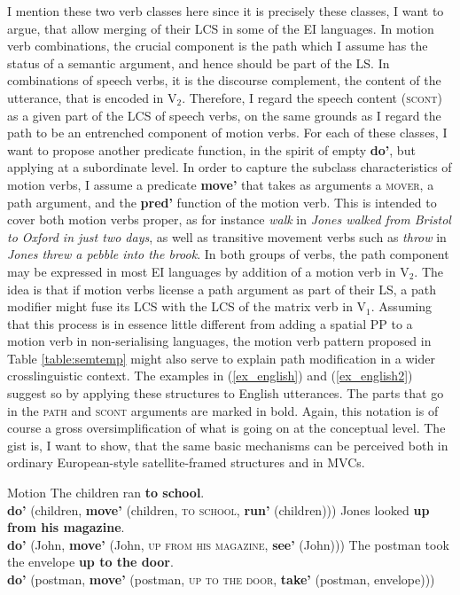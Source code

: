 I mention these two verb classes here since it is precisely these classes, I want to argue, that allow merging of their LCS in some of the EI languages. In motion verb combinations, the crucial component is the path which I assume has the status of a semantic argument, and hence should be part of the LS. In combinations of speech verbs, it is the discourse complement, the content of the utterance, that is encoded in V$_2$. Therefore, I regard the speech content (\textsc{scont}) as a given part of the LCS of speech verbs, on the same grounds as I regard the path to be an entrenched component of motion verbs. For each of these classes, I want to propose another predicate function, in the spirit of empty \textbf{do'}, but applying at a subordinate level. In order to capture the subclass characteristics of motion verbs, I assume a predicate \textbf{move'} that takes as arguments a \textsc{mover}, a path argument, and the \textbf{pred'} function of the motion verb. This is intended to cover both motion verbs proper, as for instance \textit{walk} in \textit{Jones walked from Bristol to Oxford in just two days}, as well as transitive movement verbs such as \textit{throw} in \textit{Jones threw a pebble into the brook}. In both groups of verbs, the path component may be expressed in most EI languages by addition of a motion verb in V$_2$. The idea is that if motion verbs license a path argument as part of their LS, a path modifier might fuse its LCS with the LCS of the matrix verb in V$_1$. Assuming that this process is in essence little different from adding a spatial PP to a motion verb in non-serialising languages, the motion verb pattern proposed in Table \ref{table:semtemp} might also serve to explain path modification in a wider crosslinguistic context. The examples in (\ref{ex_english}) and (\ref{ex_english2}) suggest so by applying these structures to English utterances. The parts that go in the \textsc{path} and \textsc{scont} arguments are marked in bold. Again, this notation is of course a gross oversimplification of what is going on at the conceptual level. The gist is, I want to show, that the same basic mechanisms can be perceived both in ordinary European-style satellite-framed structures and in MVCs.

\ea Motion \label{ex_english}
\ea The children ran \textbf{to school}. \\
\textbf{do'} (children, \textbf{move'} (children, \textsc{to school}, \textbf{run'} (children)))
\ex Jones looked \textbf{up from his magazine}. \\
\textbf{do'} (John, \textbf{move'} (John, \textsc{up from his magazine}, \textbf{see'} (John)))
\ex The postman took the envelope \textbf{up to the door}. \\
\textbf{do'} (postman, \textbf{move'} (postman, \textsc{up to the door}, \textbf{take'} (postman, envelope)))
\z
\z

